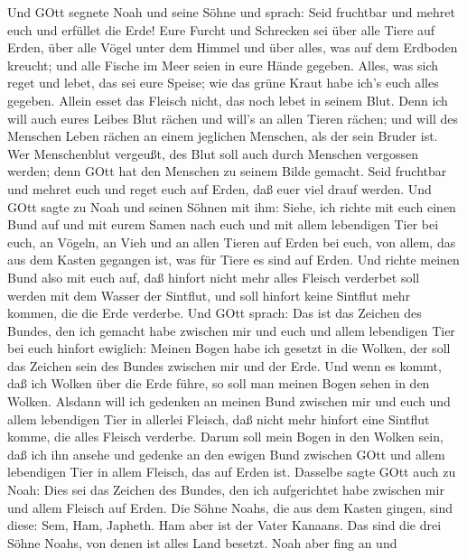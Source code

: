  Und GOtt segnete Noah und seine Söhne und sprach: Seid
fruchtbar und mehret euch und erfüllet die Erde!  Eure
Furcht und Schrecken sei über alle Tiere auf Erden, über alle Vögel
unter dem Himmel und über alles, was auf dem Erdboden kreucht; und alle
Fische im Meer seien in eure Hände gegeben.  Alles, was sich
reget und lebet, das sei eure Speise; wie das grüne Kraut habe ich's
euch alles gegeben.  Allein esset das Fleisch nicht, das
noch lebet in seinem Blut.  Denn ich will auch eures Leibes
Blut rächen und will's an allen Tieren rächen; und will des Menschen
Leben rächen an einem jeglichen Menschen, als der sein Bruder ist.
 Wer Menschenblut vergeußt, des Blut soll auch durch
Menschen vergossen werden; denn GOtt hat den Menschen zu seinem Bilde
gemacht.  Seid fruchtbar und mehret euch und reget euch auf
Erden, daß euer viel drauf werden.  Und GOtt sagte zu Noah
und seinen Söhnen mit ihm:  Siehe, ich richte mit euch einen
Bund auf und mit eurem Samen nach euch  und mit allem
lebendigen Tier bei euch, an Vögeln, an Vieh und an allen Tieren auf
Erden bei euch, von allem, das aus dem Kasten gegangen ist, was für
Tiere es sind auf Erden.  Und richte meinen Bund also mit
euch auf, daß hinfort nicht mehr alles Fleisch verderbet soll werden mit
dem Wasser der Sintflut, und soll hinfort keine Sintflut mehr kommen,
die die Erde verderbe.  Und GOtt sprach: Das ist das
Zeichen des Bundes, den ich gemacht habe zwischen mir und euch und allem
lebendigen Tier bei euch hinfort ewiglich:  Meinen Bogen
habe ich gesetzt in die Wolken, der soll das Zeichen sein des Bundes
zwischen mir und der Erde.  Und wenn es kommt, daß ich
Wolken über die Erde führe, so soll man meinen Bogen sehen in den
Wolken.  Alsdann will ich gedenken an meinen Bund zwischen
mir und euch und allem lebendigen Tier in allerlei Fleisch, daß nicht
mehr hinfort eine Sintflut komme, die alles Fleisch verderbe.
 Darum soll mein Bogen in den Wolken sein, daß ich ihn
ansehe und gedenke an den ewigen Bund zwischen GOtt und allem lebendigen
Tier in allem Fleisch, das auf Erden ist.  Dasselbe sagte
GOtt auch zu Noah: Dies sei das Zeichen des Bundes, den ich aufgerichtet
habe zwischen mir und allem Fleisch auf Erden.  Die Söhne
Noahs, die aus dem Kasten gingen, sind diese: Sem, Ham, Japheth. Ham
aber ist der Vater Kanaans.  Das sind die drei Söhne Noahs,
von denen ist alles Land besetzt.  Noah aber fing an und
